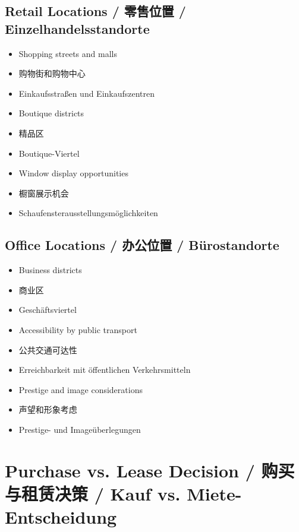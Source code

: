 \subsection{Retail Locations / 零售位置 / Einzelhandelsstandorte}
\begin{itemize}
    \item Shopping streets and malls
    \item 购物街和购物中心
    \item Einkaufsstraßen und Einkaufszentren
    \item Boutique districts
    \item 精品区
    \item Boutique-Viertel
    \item Window display opportunities
    \item 橱窗展示机会
    \item Schaufensterausstellungsmöglichkeiten
\end{itemize}

\subsection{Office Locations / 办公位置 / Bürostandorte}
\begin{itemize}
    \item Business districts
    \item 商业区
    \item Geschäftsviertel
    \item Accessibility by public transport
    \item 公共交通可达性
    \item Erreichbarkeit mit öffentlichen Verkehrsmitteln
    \item Prestige and image considerations
    \item 声望和形象考虑
    \item Prestige- und Imageüberlegungen
\end{itemize}

\section{Purchase vs. Lease Decision / 购买与租赁决策 / Kauf vs. Miete-Entscheidung}

